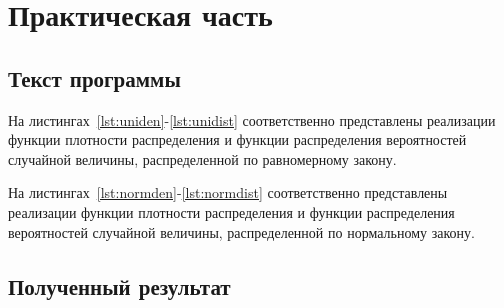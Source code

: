 \chapter{Практическая часть}

\section{Текст программы}

На листингах~\ref{lst:uniden}-\ref{lst:unidist} соответственно представлены
реализации функции плотности распределения и функции распределения вероятностей
случайной величины, распределенной по равномерному закону.

{
\captionsetup{format=hang,justification=raggedright,
              singlelinecheck=off,width=16cm}

}

На листингах~\ref{lst:normden}-\ref{lst:normdist} соответственно представлены
реализации функции плотности распределения и функции распределения вероятностей
случайной величины, распределенной по нормальному закону.

{
\captionsetup{format=hang,justification=raggedright,
              singlelinecheck=off,width=16cm}

}


\section{Полученный результат}
